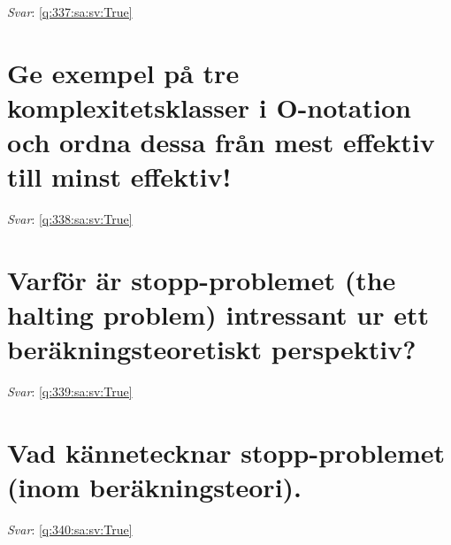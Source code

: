 \documentclass[a4paper,11pt,oneside]{book}
\begin{document}
\begin{sloppypar}
\noindent\makebox[\textwidth]{\hrulefill}

\vspace{1cm}

\textit{Svar}: \autoref{q:337:sa:sv:True}



\section{Ge exempel p\r{a} tre komplexitetsklasser i O-notation och ordna dessa fr\r{a}n mest effektiv till minst effektiv!}

\label{q:338:sa:sv:False}

\vspace{2cm}

\noindent\makebox[\textwidth]{\hrulefill}

\vspace{1cm}

\textit{Svar}: \autoref{q:338:sa:sv:True}



\section{Varf\"or \"ar stopp-problemet (the halting problem) intressant ur ett ber\"akningsteoretiskt perspektiv?}

\label{q:339:sa:sv:False}

\vspace{2cm}

\noindent\makebox[\textwidth]{\hrulefill}

\vspace{1cm}

\textit{Svar}: \autoref{q:339:sa:sv:True}



\section{Vad k\"annetecknar stopp-problemet (inom ber\"akningsteori).}

\label{q:340:sa:sv:False}

\vspace{2cm}

\noindent\makebox[\textwidth]{\hrulefill}

\vspace{1cm}

\textit{Svar}: \autoref{q:340:sa:sv:True}




\end{sloppypar}
\end{document}
